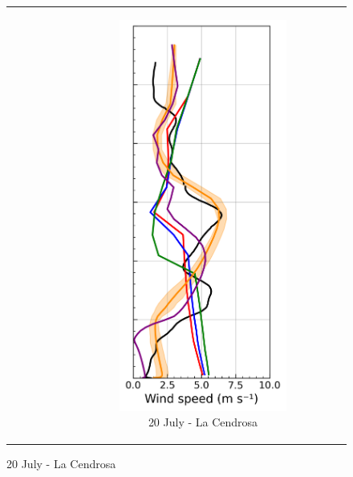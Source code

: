 \begin{figure}[hbtp]
{\begin{tabular}{@{}cccc@{}}
\begin{subfigure}[t]{0.289\textwidth}
        \end{subfigure} &
        \begin{subfigure}[t]{0.283\textwidth}
            \caption{20 July - La Cendrosa}
            \includegraphics[width=\textwidth]{images/chap6/profiles/profile_cendrosa_wind_speed_2007_.png}

\end{subfigure}
\end{tabular}}
\end{figure}
